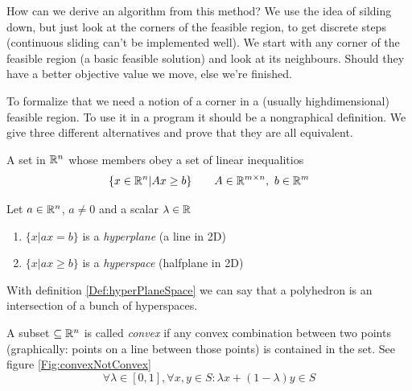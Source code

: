 How can we derive an algorithm from this method? We use the idea of silding down, but just look at the corners of the feasible region, to get discrete steps (continuous sliding can't be implemented well). We start with any corner of the feasible region (a basic feasible solution) and look at its neighbours. Should they have a better objective value we move, else we're finished. 

To formalize that we need a notion of a corner in a (usually highdimensional) feasible region. To use it in a program it should be a nongraphical definition. We give three different alternatives and prove that they are all equivalent.

\begin{Def}[Polyhedron] A set in $\mathbb{R}^n$ whose members obey a set of linear inequalitios
\[\{x\in \mathbb{R}^n | Ax \geq b\} \qquad A\in \mathbb{R}^{m\times n},\ b\in \mathbb{R}^m\]
\end{Def}

\begin{Def} \label{Def:hyperPlaneSpace} Let $a\in \mathbb{R}^n$, $a\neq 0$ and a scalar $\lambda \in \mathbb{R}$ 
\begin{enumerate}
\item $\{x|ax=b\}$ is a \emph{hyperplane} (a line in 2D)
\item $\{x|ax\geq b\}$ is a \emph{hyperspace} (halfplane in 2D)
\end{enumerate}
\end{Def}

With definition \ref{Def:hyperPlaneSpace} we can say that a polyhedron is an intersection of a bunch of hyperspaces.

\begin{Def} A subset $\subseteq \mathbb{R}^n$ is called \emph{convex} if any convex combination between two points (graphically: points on a line between those points) is contained in the set. See figure \ref{Fig:convexNotConvex}
\[\forall \lambda \in [0,1], \forall x,y\in S: \lambda x + (1-\lambda) y \in S\]
\end{Def}

